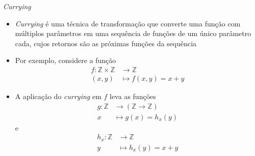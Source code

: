 \begin{frame}[fragile]{\it Currying}

    \begin{itemize}
        \item \textit{Currying} é uma técnica de transformação que converte uma função com
            múltiplos parâmetros em uma sequência de funções de um único parâmetro cada, cujos
            retornos são as próximas funções da sequência

        \item Por exemplo, considere a função 
        \begin{align*}
            f: \mathbb{Z} \times \mathbb{Z} & \to \mathbb{Z} \\
               (x, y) & \mapsto f(x, y) = x + y
        \end{align*}

        \item A aplicação do \textit{currying} em $f$ leva as funções
        \begin{align*}
            g: \mathbb{Z} & \to (\mathbb{Z} \to \mathbb{Z}) \\
               x & \mapsto g(x) = h_x(y)
        \end{align*}
        e
        \begin{align*}
            h_x: \mathbb{Z} & \to \mathbb{Z} \\
               y & \mapsto h_x(y) = x + y
        \end{align*}
    \end{itemize}

\end{frame}

